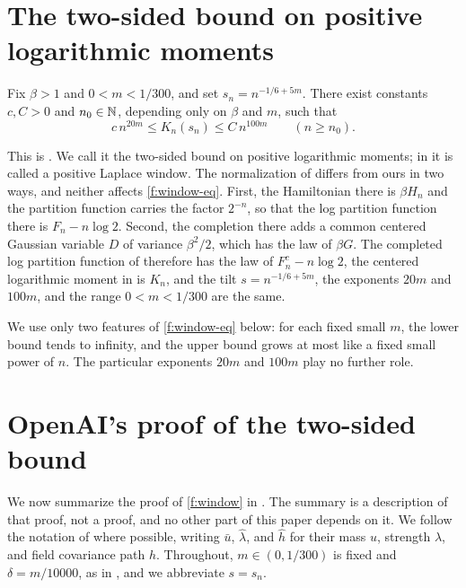 \section{The two-sided bound on positive logarithmic moments}\label{sec:fl-window}

\begin{proposition}\label{f:window}
Fix $\beta>1$ and $0<m<1/300$, and set $s_n=n^{-1/6+5m}$. There exist constants $c,C>0$ and $n_0\in\mathbb N$, depending only on $\beta$ and $m$, such that
\begin{equation}\label{f:window-eq}
 c\,n^{20m}\le K_n(s_n)\le C\,n^{100m}\qquad(n\ge n_0).
\end{equation}
\end{proposition}

This is \cite[Proposition~7.5]{oai-fluctuations}. We call it the two-sided bound on positive logarithmic moments; in \cite{oai-fluctuations} it is called a positive Laplace window. The normalization of \cite{oai-fluctuations} differs from ours in two ways, and neither affects \eqref{f:window-eq}. First, the Hamiltonian there is $\beta H_n$ and the partition function carries the factor $2^{-n}$, so that the log partition function there is $F_n-n\log 2$. Second, the completion there adds a common centered Gaussian variable $D$ of variance $\beta^2/2$, which has the law of $\beta G$. The completed log partition function of \cite{oai-fluctuations} therefore has the law of $F_n^c-n\log2$, the centered logarithmic moment in \cite[Proposition~7.5]{oai-fluctuations} is $K_n$, and the tilt $s=n^{-1/6+5m}$, the exponents $20m$ and $100m$, and the range $0<m<1/300$ are the same.

We use only two features of \eqref{f:window-eq} below: for each fixed small $m$, the lower bound tends to infinity, and the upper bound grows at most like a fixed small power of $n$. The particular exponents $20m$ and $100m$ play no further role.

\section{OpenAI's proof of the two-sided bound}\label{sec:fl-route}

We now summarize the proof of \cref{f:window} in \cite{oai-fluctuations}. The summary is a description of that proof, not a proof, and no other part of this paper depends on it. We follow the notation of \cite{oai-fluctuations} where possible, writing $\bar u$, $\widehat\lambda$, and $\widehat h$ for their mass $u$, strength $\lambda$, and field covariance path $h$. Throughout, $m\in(0,1/300)$ is fixed and $\delta=m/10000$, as in \cite[Section~3.1]{oai-fluctuations}, and we abbreviate $s=s_n$.

